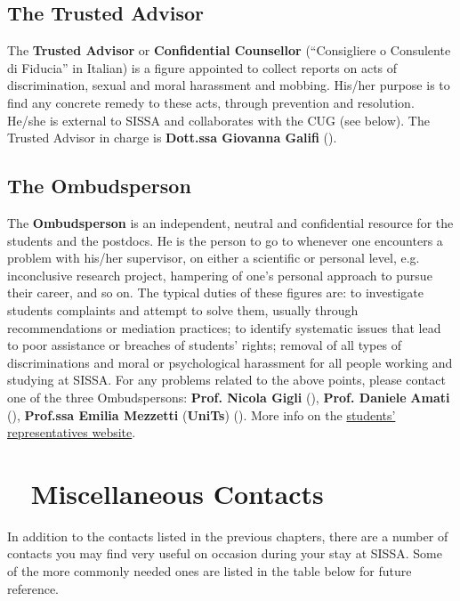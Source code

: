 \documentclass{sissavademecum}
\begin{document}
\section{The Trusted Advisor}

The \textbf{Trusted Advisor} or \textbf{Confidential Counsellor }(``Consigliere o Consulente di Fiducia'' in Italian) is a figure appointed to collect reports on acts of discrimination, sexual and moral harassment and mobbing. His/her purpose is to find any concrete remedy to these acts, through prevention and resolution. He/she is external to SISSA and collaborates with the CUG (see below). The Trusted Advisor in charge is \textbf{Dott.ssa Giovanna Galifi} ().
 

\section{The Ombudsperson}

The \textbf{Ombudsperson} is an independent, neutral and confidential resource for the students and the postdocs. He is the person to go to whenever one encounters a problem with his/her supervisor, on either a scientific or personal level, e.g. inconclusive research project, hampering of one's personal approach to pursue their career, and so on. The typical duties of these figures are: to investigate students complaints and attempt to solve them, usually through recommendations or mediation practices; to identify systematic issues that lead to poor assistance or breaches of students' rights; removal of all types of discriminations and moral or psychological harassment for all people working and studying at SISSA. For any problems related to the above points, please contact one of the three Ombudspersons: \textbf{Prof. Nicola Gigli} (), \textbf{Prof. Daniele }\textbf{Amati} (), \textbf{Prof.ssa Emilia Mezzetti} (\textbf{UniTs}) \textbf{}(). More info on the \href{http://students.sissa.it/issues/ombudsperson.html}{students' representatives website}.




\chapter{\texorpdfstring{\faAddressBook\ }{} Miscellaneous Contacts}

In addition to the contacts listed in the previous chapters, there are a number of contacts you may find very useful on occasion during your stay at SISSA. Some of the more commonly needed ones are listed in the table below for future reference.
\end{document}
